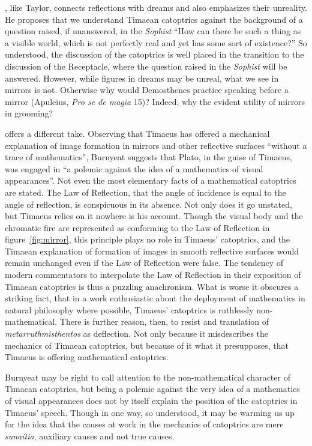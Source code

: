 \citet[156]{Cornford:1935fk}, like Taylor, connects reflections with dreams and also emphasizes their unreality. He proposes that we understand Timaean catoptrics against the background of a question raised, if unanswered, in the \emph{Sophist} ``How can there be such a thing as a visible world, which is not perfectly real and yet has some sort of existence?'' So understood, the discussion of the catoptrics is well placed in the transition to the discussion of the Receptacle, where the question raised in the \emph{Sophist} will be answered. However, while figures in dreams may be unreal, what we see in mirrors is not. Otherwise why would Demosthenes practice speaking before a mirror (Apuleius, \emph{Pro se de magia} 15)? Indeed, why the evident utility of mirrors in grooming? 

\citet[47--8]{Burnyeat:2005rc} offers a different take. Observing that Timaeus has offered a mechanical explanation of image formation in mirrors and other reflective surfaces ``without a trace of mathematics'', Burnyeat suggests that Plato, in the guise of Timaeus, was engaged in ``a polemic against the idea of a mathematics of visual appearances''. Not even the most elementary facts of a mathematical catoptrics are stated. The Law of Reflection, that the angle of incidence is equal to the angle of reflection, is conspicuous in its absence. Not only does it go unstated, but Timaeus relies on it nowhere is his account.  Though the visual body and the chromatic fire are represented as conforming to the Law of Reflection in figure~\ref{fig:mirror}, this principle plays no role in Timaeus' catoptrics, and the Timaean explanation of formation of images in smooth reflective surfaces would remain unchanged even if the Law of Reflection were false. The tendency of modern commentators to interpolate the Law of Reflection in their exposition of Timaean catoptrics is thus a puzzling anachronism. What is worse it obscures a striking fact, that in a work enthusiastic about the deployment of mathematics in natural philosophy where possible, Timaeus' catoptrics is ruthlessly non-mathematical. There is further reason, then, to resist \citet[159]{Archer-Hind:1888qd} and \citet[103]{Bury:1929jb} translation of \emph{metarruthmisthentos} as deflection. Not only because it misdescribes the mechanics of Timaean catoptrics, but because of it what it presupposes, that Timaeus is offering mathematical catoptrics.

Burnyeat may be right to call attention to the non-mathematical character of Timaean catoptrics, but being a polemic against the very idea of a mathematics of visual appearances does not by itself explain the position of the catoptrics in Timaeus' speech. Though in one way, so understood, it may be warming us up for the idea that the causes at work in the mechanics of catoptrics are mere \emph{sunaitia}, auxiliary causes and not true causes.

